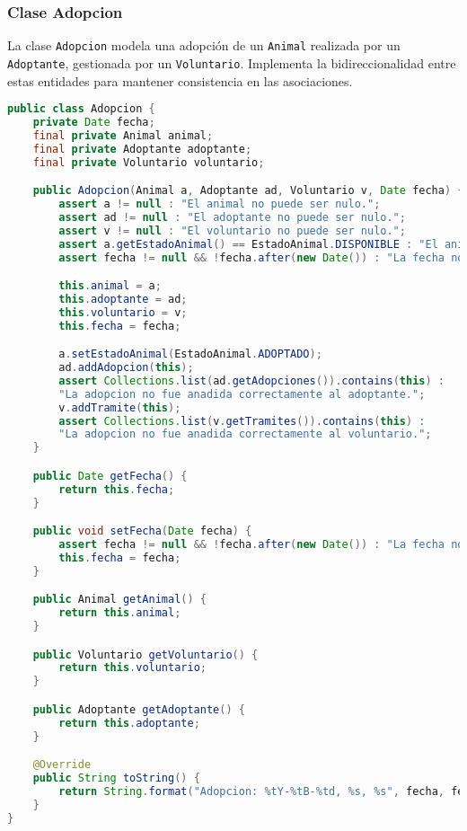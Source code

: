 \subsubsection{Clase Adopcion}
La clase \texttt{Adopcion} modela una adopción de un \texttt{Animal} realizada por un 
\texttt{Adoptante}, gestionada por un \texttt{Voluntario}. Implementa la bidireccionalidad 
entre estas entidades para mantener consistencia en las asociaciones.

\begin{lstlisting}[style = javaNormal, language=Java] 
public class Adopcion {
    private Date fecha;
    final private Animal animal;
    final private Adoptante adoptante;
    final private Voluntario voluntario;

    public Adopcion(Animal a, Adoptante ad, Voluntario v, Date fecha) {
        assert a != null : "El animal no puede ser nulo.";
        assert ad != null : "El adoptante no puede ser nulo.";
        assert v != null : "El voluntario no puede ser nulo.";
        assert a.getEstadoAnimal() == EstadoAnimal.DISPONIBLE : "El animal debe estar disponible para adopcion.";
        assert fecha != null && !fecha.after(new Date()) : "La fecha no puede ser nula ni estar en el futuro.";

        this.animal = a;
        this.adoptante = ad;
        this.voluntario = v;
        this.fecha = fecha;

        a.setEstadoAnimal(EstadoAnimal.ADOPTADO);
        ad.addAdopcion(this);
        assert Collections.list(ad.getAdopciones()).contains(this) : 
        "La adopcion no fue anadida correctamente al adoptante.";
        v.addTramite(this);
        assert Collections.list(v.getTramites()).contains(this) : 
        "La adopcion no fue anadida correctamente al voluntario.";
    }

    public Date getFecha() {
        return this.fecha;
    }

    public void setFecha(Date fecha) {
        assert fecha != null && !fecha.after(new Date()) : "La fecha no puede ser nula ni estar en el futuro";
        this.fecha = fecha;
    }

    public Animal getAnimal() {
        return this.animal;
    }

    public Voluntario getVoluntario() {
        return this.voluntario;
    }

    public Adoptante getAdoptante() {
        return this.adoptante;
    }

    @Override
    public String toString() {
        return String.format("Adopcion: %tY-%tB-%td, %s, %s", fecha, fecha, fecha, animal, adoptante);
    }
}
\end{lstlisting}
\label{codigo:animal}
